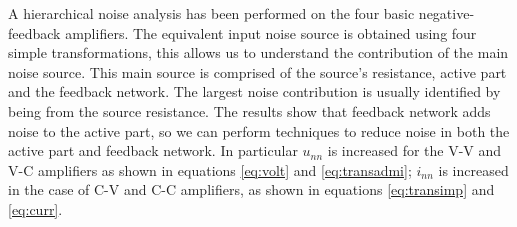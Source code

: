 \documentclass[letterpaper]{ecctd01}
\begin{document}
A hierarchical noise analysis has been performed on the four basic negative-feedback amplifiers. The equivalent input noise source is obtained using four simple transformations, this allows us to understand the contribution of the main noise source. This main source is comprised of the source's resistance, active part and the feedback network. The largest noise contribution is usually identified by being from the source resistance. The results show that feedback network adds noise to the active part, so we can perform techniques to reduce noise in both the active part and feedback network. In particular $u_{nn}$ is increased for the V-V and V-C amplifiers as shown in equations \ref{eq:volt} and \ref{eq:transadmi}; $i_{nn}$ is increased in the case of C-V and C-C amplifiers, as shown in equations \ref{eq:transimp} and \ref{eq:curr}.


\end{document}
